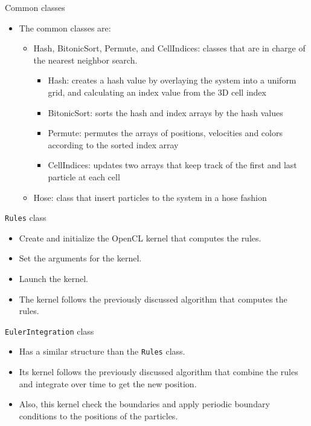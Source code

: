 \documentclass[red]{beamer}
\begin{document}
\begin{frame}{Common classes}
	\begin{itemize}
		\pause \item The common classes are:
			\begin{itemize}
				\pause \item Hash, BitonicSort, Permute, and CellIndices: classes that are in charge of the nearest neighbor search.
					\begin{itemize}
						\pause \item Hash: creates a hash value by overlaying the system into a uniform grid, and calculating an index value from the 3D cell index
						\pause \item BitonicSort: sorts the hash and index arrays by the hash values
						\pause \item Permute: permutes the arrays of positions, velocities and colors according to the sorted index array
						\pause \item CellIndices: updates two arrays that keep track of the first and last particle at each cell
					\end{itemize}
				\pause \item Hose: class that insert particles to the system in a hose fashion
			\end{itemize}
	\end{itemize}
\end{frame}

\begin{frame}{\texttt{Rules} class}
	\begin{itemize}
		\pause \item Create and initialize the OpenCL kernel that computes the rules.
		\pause \item Set the arguments for the kernel.
		\pause \item Launch the kernel.
		\pause \item The kernel follows the previously discussed algorithm that computes the rules.
	\end{itemize}
\end{frame}

\begin{frame}{\texttt{EulerIntegration} class}
	\begin{itemize}
		\pause \item Has a similar structure than the \texttt{Rules} class.
		\pause \item Its kernel follows the previously discussed algorithm that combine the rules and integrate over time to get the new position.
		\pause \item Also, this kernel check the boundaries and apply periodic boundary conditions to the positions of the particles.
	\end{itemize}
\end{frame}
\end{document}
